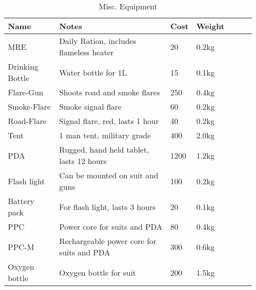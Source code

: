 \begin{table}
  \caption{Misc. Equipment}
  \label{tab:MiscEquipment}
  \begin{center}
    \begin{tabular}{| l | l | l | l | l | l | l |}

      \hline
      \textbf{Name} & \textbf{Notes} & \textbf{Cost} & \textbf{Weight} \\ \hline

      MRE             & Daily Ration, includes flameless heater  &   20 & 0.2kg \\ \hline
      Drinking Bottle & Water bottle for 1L                      &   15 & 0.1kg \\ \hline

      Flare-Gun       & Shoots road and smoke flares             &  250 & 0.4kg \\ \hline
      Smoke-Flare     & Smoke signal flare                       &   60 & 0.2kg \\ \hline
      Road-Flare      & Signal flare, red, lasts 1 hour          &   40 & 0.2kg \\ \hline

      Tent            & 1 man tent, military grade               &  400 & 2.0kg \\ \hline

      PDA             & Rugged, hand held tablet, lasts 12 hours & 1200 & 1.2kg \\ \hline

      Flash light     & Can be mounted on suit and guns          &  100 & 0.2kg \\ \hline

      Battery pack    & For flash light, lasts 3 hours           &   20 & 0.1kg \\ \hline
      PPC             & Power core for suits and PDA             &   80 & 0.4kg \\ \hline
      PPC-M           & Rechargeable power core for suits and PDA & 300 & 0.6kg \\ \hline
      Oxygen bottle   & Oxygen bottle for suit                   &  200 & 1.5kg \\ \hline

    \end{tabular}
  \end{center}
\end{table}
